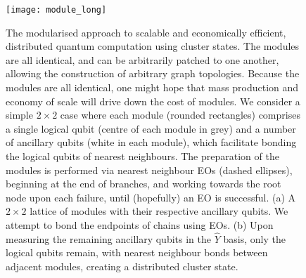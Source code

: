 \pubmode
\begin{figure}[!htbp]
\texttt{[image: module\_long]}
\captionspace \caption{The modularised approach to scalable and economically efficient, distributed quantum computation using cluster states. The modules are all identical, and can be arbitrarily patched to one another, allowing the construction of arbitrary graph topologies. Because the modules are all identical, one might hope that mass production and economy of scale will drive down the cost of modules. We consider a simple \mbox{$2\times 2$} case where each module (rounded rectangles) comprises a single logical qubit (centre of each module in grey) and a number of ancillary qubits (white in each module), which facilitate bonding the logical qubits of nearest neighbours. The preparation of the modules is performed via nearest neighbour EOs (dashed ellipses), beginning at the end of branches, and working towards the root node upon each failure, until (hopefully) an EO is successful. (a) A \mbox{$2\times 2$} lattice of modules with their respective ancillary qubits. We attempt to bond the endpoints of chains using EOs. (b) Upon measuring the remaining ancillary qubits in the $\hat{Y}$ basis, only the logical qubits remain, with nearest neighbour bonds between adjacent modules, creating a distributed cluster state.} \label{fig:module}
\end{figure}
\else
